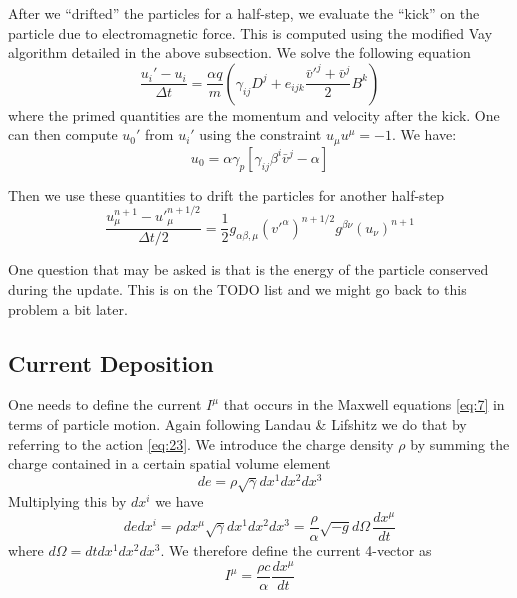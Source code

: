 After we ``drifted'' the particles for a half-step, we evaluate the ``kick'' on
the particle due to electromagnetic force. This is computed using the modified
Vay algorithm detailed in the above subsection. We solve the following equation
\begin{equation}
  \label{eq:57}
  \frac{u_i' - u_i}{\Delta t} = \frac{\alpha q}{m}\left( \gamma_{ij}D^j + e_{ijk}\frac{\bar{v}'^j + \bar{v}^j}{2}B^k \right)
\end{equation}
where the primed quantities are the momentum and velocity after the kick. One
can then compute $u_0'$ from $u_i'$ using the constraint $u_{\mu}u^{\mu} = -1$.
We have:
\begin{equation}
  \label{eq:59}
  u_0 = \alpha\gamma_p \left[ \gamma_{ij}\beta^i\bar{v}^j - \alpha \right]
\end{equation}

Then we use these quantities to drift the particles for another half-step
\begin{equation}
  \label{eq:58}
  \frac{u_{\mu}^{n+1} - u'^{n+1/2}_{\mu}}{\Delta t/2} = \frac{1}{2}g_{\alpha\beta,\mu}(v'^{\alpha})^{n+1/2}g^{\beta\nu}(u_{\nu})^{n+1}
\end{equation}

One question that may be asked is that is the energy of the particle conserved
during the update. This is on the TODO list and we might go back to this problem
a bit later.

\subsection{Current Deposition}
\label{sec:current}

One needs to define the current $I^{\mu}$ that occurs in the Maxwell equations
\eqref{eq:7} in terms of particle motion. Again following Landau \& Lifshitz we
do that by referring to the action \eqref{eq:23}. We introduce the charge
density $\rho$ by summing the charge contained in a certain spatial volume element
\begin{equation}
  \label{eq:32}
  de = \rho\sqrt{\gamma}dx^1dx^2dx^3
\end{equation}
Multiplying this by $dx^i$ we have
\begin{equation}
  de dx^i = \rho dx^\mu\sqrt{\gamma}dx^1dx^2dx^3 = \frac{\rho}{\alpha}\sqrt{-g}d\Omega\,\frac{dx^\mu}{dt}
\end{equation}
where $d\Omega = dtdx^1dx^2dx^3$. We therefore define the current 4-vector as
\begin{equation}
  \label{eq:33}
  I^{\mu} = \frac{\rho c}{\alpha}\frac{dx^{\mu}}{dt}
\end{equation}

